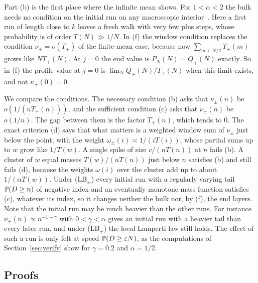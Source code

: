 Part (b) is the first place where the infinite mean shows. For $1<\alpha<2$ the bulk
needs no condition on the initial run on any macroscopic interior~\cite{paperF}.
Here a first run of length close to $k$ leaves a fresh walk with very few plus steps,
whose probability is of order $T(N)\gg1/N$. In (f) the window condition replaces the
condition $\nu_\plus=o(T_\plus)$ of the finite-mean case, because now
$\sum_{m<N/2}T_\plus(m)$ grows like $NT_\plus(N)$. At $j=0$ the end value is
$P_N(N)=Q_\plus(N)$ exactly. So in (f) the profile value at $j=0$ is
$\lim_NQ_\plus(N)/T_\plus(N)$ when this limit exists, and not $\kappa_\plus(0)=0$.

We compare the conditions. The necessary condition (b) asks that $\nu_\pm(n)$ be
$o(1/(nT_\plus(n)))$, and the sufficient condition (c) asks that $\nu_\pm(n)$ be $o(1/n)$.
The gap between them is the factor $T_\plus(n)$, which tends to $0$. The exact criterion (d)
says that what matters is a weighted window sum of $\nu_\pm$ just below the point, with the
weight $\omega_\pm(i)\asymp1/(iT(i))$, whose partial sums up to $w$ grow like $1/T(w)$. A single
spike of size $c/(nT(n))$ at $n$ fails (b). A cluster of $w$ equal masses $T(w)/(nT(n))$ just
below $n$ satisfies (b) and still fails (d), because the weights $\omega(i)$ over the cluster add
up to about $1/(\alpha T(w))$. Under (LB$_\pm$) every initial
run with a regularly varying tail $\mathbb{P}(D\ge n)$ of negative index and an eventually monotone
mass function satisfies (c), whatever its index, so it changes neither the bulk nor, by (f),
the end layers. Note that the initial run may be much heavier than the other runs. For instance
$\nu_\pm(n)\propto n^{-1-\gamma}$ with $0<\gamma<\alpha$ gives an initial run with a heavier tail
than every later run, and under (LB$_\pm$) the local Lamperti law still holds. The effect of such a run is
only felt at speed $\mathbb{P}(D\ge\varepsilon N)$, as the computations of Section~\ref{sec:verify}
show for $\gamma=0.2$ and $\alpha=1/2$.

\subsection{Proofs}

